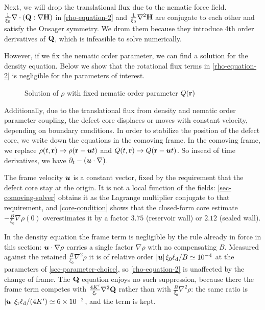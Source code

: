 \documentclass[a5paper]{article}
\begin{document}
Next, we will drop the translational flux due to the nematic force field. $\frac{1}{\xi_0} \nabla\cdot \left(\mathbf{Q}:\nabla \mathbf{H}\right)$ in \cref{rho-equation-2} and $\frac{1}{\xi_0} \nabla^2 \mathbf{H}$ are conjugate to each other and satisfy the Onsager symmetry. We drom them because they introduce 4th order derivatives of $\mathbf{Q}$, which is infeasible to solve numerically.

However, if we fix the nematic order parameter, we can find a solution for the density equation. Below we show that the rotational flux terms in \cref{rho-equation-2} is negligible for the parameters of interest.

\begin{figure}[h!]
    \centering
    \caption{Solution of $\rho$ with fixed nematic order parameter $Q(\mathbf{r})$}
    \label{fig:steady_state}
\end{figure}

Additionally, due to the translational flux from density and nematic order parameter coupling, the defect core displaces or moves with constant velocity, depending on boundary conditions. In order to stabilize the position of the defect core, we write down the equations in the comoving frame.
In the comoving frame, we replace $\rho(t,\mathbf{r})\to\rho(\mathbf{r}-\boldsymbol{u} t)$ and $Q(t,\mathbf{r})\to Q(\mathbf{r}-\boldsymbol{u} t)$. 
So insead of time derivatives, we have $\partial_t-(\boldsymbol{u} \cdot \nabla)$. 

The frame velocity $\boldsymbol{u}$ is a constant vector, fixed by the requirement that the defect core stay at the origin. It is not a local function of the fields: \cref{sec-comoving-solver} obtains it as the Lagrange multiplier conjugate to that requirement, and \eqref{core-condition} shows that the closed-form core estimate $-\frac{B}{\xi_0}\nabla\rho(0)$ overestimates it by a factor $3.75$ (reservoir wall) or $2.12$ (sealed wall).

In the density equation the frame term is negligible by the rule already in force in this section: $\boldsymbol{u} \cdot \nabla \rho$ carries a single factor $\nabla\rho$ with no compensating $B$. Measured against the retained $\frac{B}{\xi_0}\nabla^2\rho$ it is of relative order $|\boldsymbol{u}|\,\xi_0\ell_{\rm d}/B \simeq 10^{-4}$ at the parameters of \cref{sec-parameter-choice}, so \eqref{rho-equation-2} is unaffected by the change of frame. The $\mathbf{Q}$ equation enjoys no such suppression, because there the frame term competes with $\frac{4K'}{\xi_{\rm r}}\nabla^2\mathbf{Q}$ rather than with $\frac{B}{\xi_0}\nabla^2\rho$: the same ratio is $|\boldsymbol{u}|\,\xi_{\rm r}\ell_{\rm d}/(4K') \simeq 6\times10^{-2}$, and the term is kept.
\end{document}
